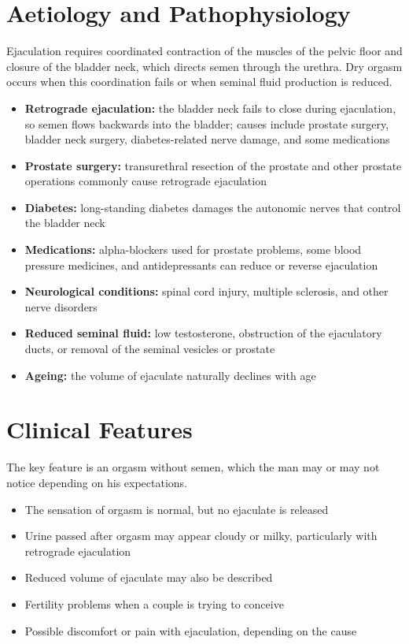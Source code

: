 \section*{Aetiology and Pathophysiology}
Ejaculation requires coordinated contraction of the muscles of the pelvic floor and closure of the bladder neck, which directs semen through the urethra. Dry orgasm occurs when this coordination fails or when seminal fluid production is reduced.
\begin{itemize}
    \item \textbf{Retrograde ejaculation:} the bladder neck fails to close during ejaculation, so semen flows backwards into the bladder; causes include prostate surgery, bladder neck surgery, diabetes-related nerve damage, and some medications
    \item \textbf{Prostate surgery:} transurethral resection of the prostate and other prostate operations commonly cause retrograde ejaculation
    \item \textbf{Diabetes:} long-standing diabetes damages the autonomic nerves that control the bladder neck
    \item \textbf{Medications:} alpha-blockers used for prostate problems, some blood pressure medicines, and antidepressants can reduce or reverse ejaculation
    \item \textbf{Neurological conditions:} spinal cord injury, multiple sclerosis, and other nerve disorders
    \item \textbf{Reduced seminal fluid:} low testosterone, obstruction of the ejaculatory ducts, or removal of the seminal vesicles or prostate
    \item \textbf{Ageing:} the volume of ejaculate naturally declines with age
\end{itemize}

\section*{Clinical Features}
The key feature is an orgasm without semen, which the man may or may not notice depending on his expectations.
\begin{itemize}
    \item The sensation of orgasm is normal, but no ejaculate is released
    \item Urine passed after orgasm may appear cloudy or milky, particularly with retrograde ejaculation
    \item Reduced volume of ejaculate may also be described
    \item Fertility problems when a couple is trying to conceive
    \item Possible discomfort or pain with ejaculation, depending on the cause
\end{itemize}

